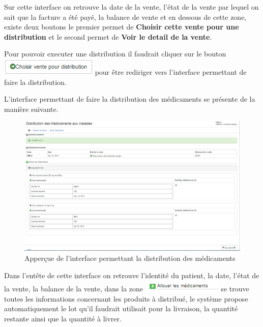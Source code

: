 \documentclass[12pt,a4paper]{report}
\begin{document}
\newpage

Sur cette interface on retrouve la date de la vente, l'état de la vente par lequel on sait que la facture a été payé, la balance de vente et en dessous de cette zone, existe deux boutons le premier permet de \textbf{Choisir cette vente pour une distribution} et le second permet de \textbf{Voir le detail de la vente}. 

Pour pouvoir executer une distribution il faudrait cliquer sur le bouton \includegraphics[scale=0.7]{pic/ChoisirDistr.png} pour être rediriger vers l'interface permettant de faire la distribution.

L'interface permettant de faire la distribution des médicaments se présente de la manière suivante.

\begin{figure}[h]
\begin{center}
\includegraphics[width=14cm]{pic/DistrMedPatient.png}
\end{center}
\caption{Apperçue de l'interface permettant la distribution des médicaments}
\label{Apperçue de l'interface permettant la distribution des médicaments}
\end{figure}

Dans l'entête de cette interface on retrouve l'identité du patient, la date, l'état de la vente, la balance de la vente, dans la zone \includegraphics[scale=0.7]{pic/AllocateDrug.png} se trouve toutes les informations concernant les produits à distribué, le système propose automatiquement le lot qu'il faudrait utilisait pour la livraison, la quantité restante ainsi que la quantité à livrer.
\end{document}
